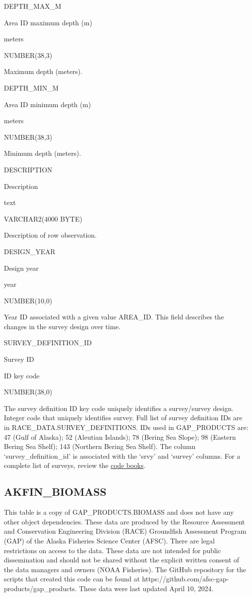 \documentclass[
  letterpaper,
  oneside,
  open=any]{scrbook}
\begin{document}
DEPTH\_MAX\_M

Area ID maximum depth (m)

meters

NUMBER(38,3)

Maximum depth (meters).

DEPTH\_MIN\_M

Area ID minimum depth (m)

meters

NUMBER(38,3)

Minimum depth (meters).

DESCRIPTION

Description

text

VARCHAR2(4000 BYTE)

Description of row observation.

DESIGN\_YEAR

Design year

year

NUMBER(10,0)

Year ID associated with a given value AREA\_ID. This field describes the
changes in the survey design over time.

SURVEY\_DEFINITION\_ID

Survey ID

ID key code

NUMBER(38,0)

The survey definition ID key code uniquely identifies a survey/survey
design. Integer code that uniquely identifies survey. Full list of
survey definition IDs are in RACE\_DATA.SURVEY\_DEFINITIONS. IDs used in
GAP\_PRODUCTS are: 47 (Gulf of Alaska); 52 (Aleutian Islands); 78
(Bering Sea Slope); 98 (Eastern Bering Sea Shelf); 143 (Northern Bering
Sea Shelf). The column `survey\_definition\_id' is associated with the
`srvy' and `survey' columns. For a complete list of surveys, review the
\href{https://www.fisheries.noaa.gov/resource/document/groundfish-survey-species-code-manual-and-data-codes-manual}{code
books}.

\hypertarget{akfin_biomass}{%
\subsection{AKFIN\_BIOMASS}\label{akfin_biomass}}

This table is a copy of GAP\_PRODUCTS.BIOMASS and does not have any
other object dependencies. These data are produced by the Resource
Assessment and Conservation Engineering Division (RACE) Groundfish
Assessment Program (GAP) of the Alaska Fisheries Science Center (AFSC).
There are legal restrictions on access to the data. These data are not
intended for public dissemination and should not be shared without the
explicit written consent of the data managers and owners (NOAA
Fisheries). The GitHub repository for the scripts that created this code
can be found at https://github.com/afsc-gap-products/gap\_products.
These data were last updated April 10, 2024.
\end{document}
